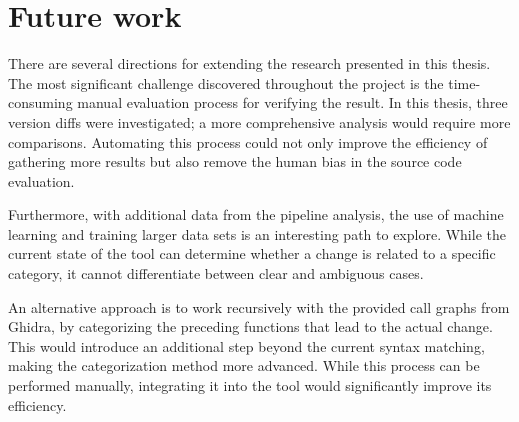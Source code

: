 \section{Future work}

There are several directions for extending the research presented in this thesis. The most significant challenge discovered throughout the project is the time-consuming manual evaluation process for verifying the result. In this thesis, three version diffs were investigated; a more comprehensive analysis would require more comparisons. Automating this process could not only improve the efficiency of gathering more results but also remove the human bias in the source code evaluation. 

Furthermore, with additional data from the pipeline analysis, the use of machine learning and training larger data sets is an interesting path to explore. While the current state of the tool can determine whether a change is related to a specific category, it cannot differentiate between clear and ambiguous cases.

An alternative approach is to work recursively with the provided call graphs from Ghidra, by categorizing the preceding functions that lead to the actual change. This would introduce an additional step beyond the current syntax matching, making the categorization method more advanced. While this process can be performed manually, integrating it into the tool would significantly improve its efficiency. 


